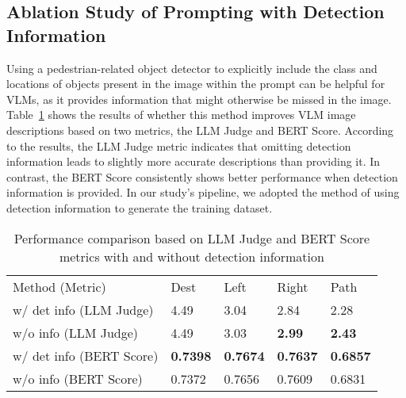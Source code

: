 \subsection{Ablation Study of Prompting with Detection Information}
Using a pedestrian-related object detector to explicitly include the class and locations of objects present in the image within the prompt can be helpful for VLMs, as it provides information that might otherwise be missed in the image. Table~\ref{table:det_info} shows the results of whether this method improves VLM image descriptions based on two metrics, the LLM Judge and BERT Score. According to the results, the LLM Judge metric indicates that omitting detection information leads to slightly more accurate descriptions than providing it. In contrast, the BERT Score consistently shows better performance when detection information is provided. In our study’s pipeline, we adopted the method of using detection information to generate the training dataset.

\begin{table}[!ht]
    \caption{Performance comparison based on LLM Judge and BERT Score metrics with and without detection information}
    \centering
    \begin{tabular}{|l|l|l|l|l|}
    \hline
        Method (Metric) & Dest & Left & Right & Path \\ \hhline{|=|=|=|=|=|}
        w/ det info (LLM Judge)  & 4.49 & 3.04 & 2.84 & 2.28 \\ \hline
        w/o info (LLM Judge)     & 4.49 & 3.03 & \textbf{2.99} & \textbf{2.43} \\ \hhline{|=|=|=|=|=|}
        w/ det info (BERT Score) & \textbf{0.7398} & \textbf{0.7674} & \textbf{0.7637} & \textbf{0.6857} \\ \hline
        w/o info (BERT Score)    & 0.7372 & 0.7656 & 0.7609 & 0.6831 \\ \hline
    \end{tabular}
    \label{table:det_info}
\end{table}